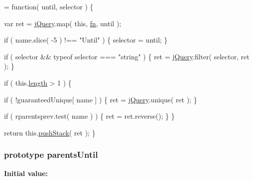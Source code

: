 \begin{DoxyCode}
= \textcolor{keyword}{function}( until, selector ) \{


        var ret = \hyperlink{jquery-1_810_82-vsdoc_8js_add5237586d970a38a81f990e8eb28c6c}{jQuery}.map( \textcolor{keyword}{this}, \hyperlink{jquery-1_810_82-vsdoc_8js_acef6bdaf6b9b20fdcca1ea86f0902c3b}{fn}, until );

        \textcolor{keywordflow}{if} ( name.slice( -5 ) !== \textcolor{stringliteral}{"Until"} ) \{
            selector = until;
        \}

        \textcolor{keywordflow}{if} ( selector && typeof selector === \textcolor{stringliteral}{"string"} ) \{
            ret = \hyperlink{jquery-1_810_82-vsdoc_8js_add5237586d970a38a81f990e8eb28c6c}{jQuery}.filter( selector, ret );
        \}

        \textcolor{keywordflow}{if} ( this.\hyperlink{jquery-1_810_82-vsdoc_8js_aa7de35d58da66d9944ab9cbe82c19640}{length} > 1 ) \{
            
            \textcolor{keywordflow}{if} ( !guaranteedUnique[ name ] ) \{
                ret = \hyperlink{jquery-1_810_82-vsdoc_8js_add5237586d970a38a81f990e8eb28c6c}{jQuery}.unique( ret );
            \}

            
            \textcolor{keywordflow}{if} ( rparentsprev.test( name ) ) \{
                ret = ret.reverse();
            \}
        \}

        \textcolor{keywordflow}{return} this.\hyperlink{jquery-1_810_82-vsdoc_8js_afc3a7db1ef2b526338c06c07cecccd44}{pushStack}( ret );
    \}
\end{DoxyCode}
\hypertarget{jquery-1_810_82-vsdoc_8js_ae2d1b0226f1427006ca38baad3dd6968}{
\subsubsection[{parents\-Until}]{ {\bf prototype} parents\-Until}}\label{jquery-1_810_82-vsdoc_8js_ae2d1b0226f1427006ca38baad3dd6968}
{\bfseries Initial value\-:}
